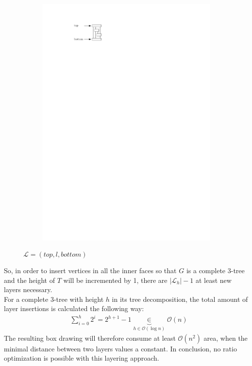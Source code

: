 \begin{figure}[H]
	\centering
	\begin{subfigure}{\textwidth}
		\centering
		\includegraphics[page=3,width=0.6\linewidth]{graphics/3-tree_example.pdf}
	\end{subfigure}
	\caption*{$\mathcal{L} = (top, l, bottom)$}
\end{figure}
So, in order to insert vertices in all the inner faces so that $G$ is a complete 3-tree and the height of $T$ will be incremented by 1, there are $|\mathcal{L}_h|-1$ at least new layers necessary.\\
For a complete 3-tree with height $h$ in its tree decomposition, the total amount of layer insertions is calculated the following way:
\begin{align*}
	&\sum_{i=0}^{h} 2^i = 2^{h+1}-1 \underbrace{\in}_{h\in \mathcal{O}(\log n)} \mathcal{O}(n)
\end{align*}
The resulting box drawing will therefore consume at least $\mathcal{O}(n^2)$ area, when the minimal distance between two layers values a constant. In conclusion, no ratio optimization is possible with this layering approach.
